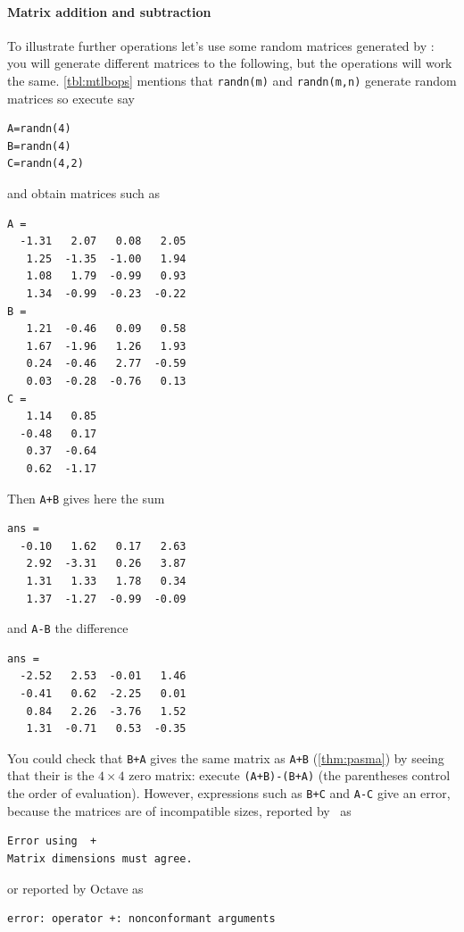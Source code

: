 \paragraph{Matrix addition and subtraction}
To illustrate further operations let's use some random matrices generated by \script: you will generate different matrices to the following, but the operations will work the same.
\cref{tbl:mtlbops} mentions that \verb|randn(m)| and \verb|randn(m,n)| generate random matrices so execute say
\begin{verbatim}
A=randn(4)
B=randn(4)
C=randn(4,2)
\end{verbatim}
and obtain matrices such as \twodp
\setbox\ajrqrbox\hbox{}%
\marginajrbox%
\begin{verbatim}
A =
  -1.31   2.07   0.08   2.05
   1.25  -1.35  -1.00   1.94
   1.08   1.79  -0.99   0.93
   1.34  -0.99  -0.23  -0.22
B =
   1.21  -0.46   0.09   0.58
   1.67  -1.96   1.26   1.93
   0.24  -0.46   2.77  -0.59
   0.03  -0.28  -0.76   0.13
C =
   1.14   0.85
  -0.48   0.17
   0.37  -0.64
   0.62  -1.17
\end{verbatim}
Then \verb|A+B| gives here the sum
\begin{verbatim}
ans =
  -0.10   1.62   0.17   2.63
   2.92  -3.31   0.26   3.87
   1.31   1.33   1.78   0.34
   1.37  -1.27  -0.99  -0.09
\end{verbatim}
and \verb|A-B| the difference
\begin{verbatim}
ans =
  -2.52   2.53  -0.01   1.46
  -0.41   0.62  -2.25   0.01
   0.84   2.26  -3.76   1.52
   1.31  -0.71   0.53  -0.35
\end{verbatim}
You could check that \verb|B+A| gives the same matrix as \verb|A+B| (\cref{thm:pasma}) by seeing that their  is the \(4\times4\) zero matrix: execute \verb|(A+B)-(B+A)| (the parentheses control the order of evaluation).
However, expressions such as \verb|B+C| and \verb|A-C| give an error, because the matrices are of incompatible sizes, reported by \script[1]\ as%
%
%
\begin{verbatim}
Error using  + 
Matrix dimensions must agree. 
\end{verbatim}
or reported by Octave as
\begin{verbatim}
error: operator +: nonconformant arguments 
\end{verbatim}


